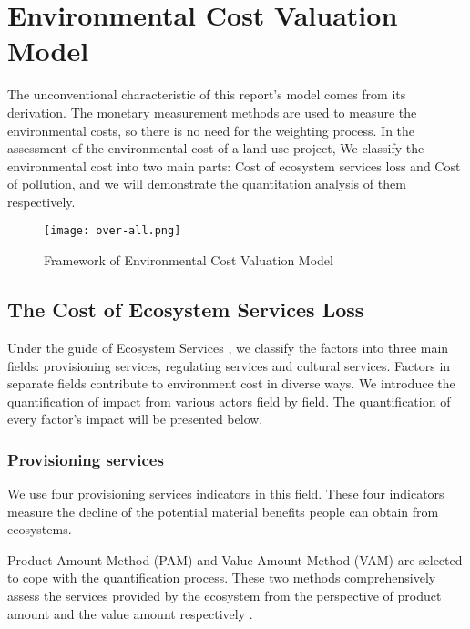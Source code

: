 \documentclass{mcmthesis}
\begin{document}
	
	\section{Environmental Cost Valuation Model}
	
		The unconventional characteristic of this report's model comes from its derivation. The monetary measurement methods are used to measure the environmental costs, so there is no need for the weighting process. In the assessment of the environmental cost of a land use project, We classify the environmental cost into two main parts: Cost of ecosystem services loss and Cost of pollution, and we will demonstrate the quantitation analysis of them respectively.
		
		
		\begin{figure}[h]
			\small
			\centering
			\texttt{[image: over-all.png]}
			\caption{Framework of Environmental Cost Valuation Model}
			\label{fig:over-all}
		\end{figure}
	
		\subsection{The Cost of Ecosystem Services Loss}
		
			Under the guide of Ecosystem Services \cite{assessment2005millennium}, we classify the factors into three main fields: provisioning services, regulating services and cultural services. Factors in separate fields contribute to environment cost in diverse ways. We introduce the quantification of impact from various actors field by field. The quantification of every factor's impact will be presented below.
	
			\subsubsection{Provisioning services}
			
				We use four provisioning services indicators in this field. These four indicators measure the decline of the potential material benefits people can obtain from ecosystems.
				
				Product Amount Method (PAM) and Value Amount Method (VAM) are selected to cope with the quantification process. These two methods comprehensively assess the services provided by the ecosystem from the perspective of product amount and the value amount respectively \cite{zhiming2017valuation}.
				
\end{document}
